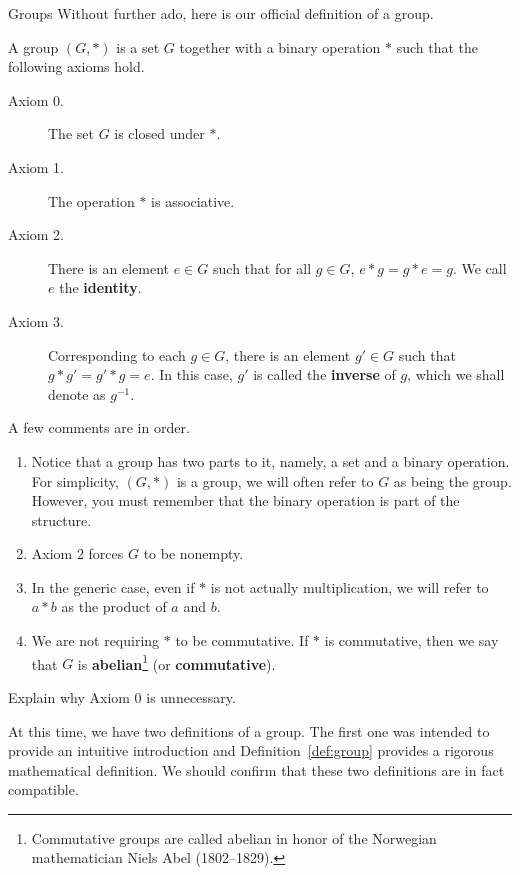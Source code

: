 \begin{section}{Groups}
Without further ado, here is our official definition of a group.

\begin{definition}\label{def:group}
A group $(G,*)$ is a set $G$ together with a binary operation $*$ such that the following axioms hold.
\begin{description}
\item[Axiom 0.] The set $G$ is closed under $*$.
\item[Axiom 1.] The operation $*$ is associative.
\item[Axiom 2.] There is an element $e\in G$ such that for all $g\in G$, $e*g=g*e=g$.  We call $e$ the \textbf{identity}.
\item[Axiom 3.] Corresponding to each $g\in G$, there is an element $g'\in G$ such that $g*g'=g'*g=e$.  In this case, $g'$ is called the \textbf{inverse} of $g$, which we shall denote as $g^{-1}$.
\end{description}
\end{definition}

\begin{remark}
A few comments are in order.
\begin{enumerate}
\item Notice that a group has two parts to it, namely, a set and a binary operation.  For simplicity, $(G,*)$ is a group, we will often refer to $G$ as being the group.  However, you must remember that the binary operation is part of the structure.
\item Axiom 2 forces $G$ to be nonempty.
\item In the generic case, even if $*$ is not actually multiplication, we will refer to $a*b$ as the product of $a$ and $b$.
\item We are not requiring $*$ to be commutative.  If $*$ is commutative, then we say that $G$ is \textbf{abelian}\footnote{Commutative groups are called abelian in honor of the Norwegian mathematician Niels Abel (1802--1829).} (or \textbf{commutative}).
\end{enumerate}
\end{remark}

\begin{exercise}
Explain why Axiom 0 is unnecessary.
\end{exercise}

At this time, we have two definitions of a group.  The first one was intended to provide an intuitive introduction and Definition~\ref{def:group} provides a rigorous mathematical definition.  We should confirm that these two definitions are in fact compatible.


\end{section}
